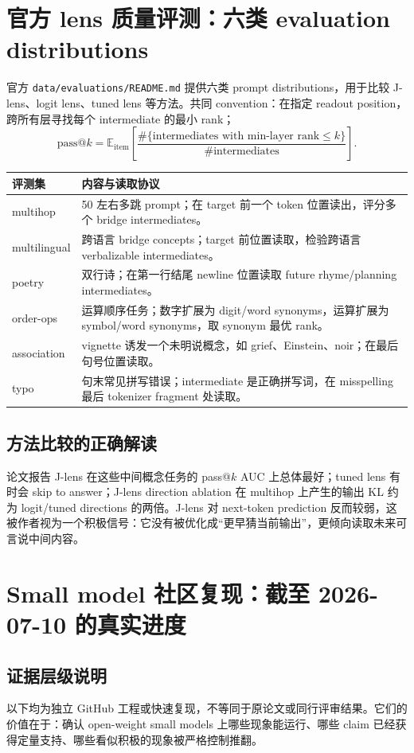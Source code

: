 \documentclass[10.5pt,a4paper]{ctexart}
\begin{document}
\section{官方 lens 质量评测：六类 evaluation distributions}
官方 \texttt{data/evaluations/README.md} 提供六类 prompt distributions，用于比较 J-lens、logit lens、tuned lens 等方法。共同 convention：在指定 readout position，跨所有层寻找每个 intermediate 的最小 rank；
\[
\mathrm{pass@}k
=
\mathbb E_{\mathrm{item}}
\left[
\frac{\#\{\text{intermediates with min-layer rank}\le k\}}{\#\text{intermediates}}
\right].
\]

\begin{longtable}{p{}p{}}
\toprule
评测集 & 内容与读取协议 \\
\midrule
multihop & 50 左右多跳 prompt；在 target 前一个 token 位置读出，评分多个 bridge intermediates。 \\
multilingual & 跨语言 bridge concepts；target 前位置读取，检验跨语言 verbalizable intermediates。 \\
poetry & 双行诗；在第一行结尾 newline 位置读取 future rhyme/planning intermediates。 \\
order-ops & 运算顺序任务；数字扩展为 digit/word synonyms，运算扩展为 symbol/word synonyms，取 synonym 最优 rank。 \\
association & vignette 诱发一个未明说概念，如 grief、Einstein、noir；在最后句号位置读取。 \\
typo & 句末常见拼写错误；intermediate 是正确拼写词，在 misspelling 最后 tokenizer fragment 处读取。 \\
\bottomrule
\end{longtable}

\subsection{方法比较的正确解读}
论文报告 J-lens 在这些中间概念任务的 pass@$k$ AUC 上总体最好；tuned lens 有时会 skip to answer；J-lens direction ablation 在 multihop 上产生的输出 KL 约为 logit/tuned directions 的两倍。J-lens 对 next-token prediction 反而较弱，这被作者视为一个积极信号：它没有被优化成“更早猜当前输出”，更倾向读取未来可言说中间内容。

\section{Small model 社区复现：截至 2026-07-10 的真实进度}

\subsection{证据层级说明}
以下均为独立 GitHub 工程或快速复现，不等同于原论文或同行评审结果。它们的价值在于：确认 open-weight small models 上哪些现象能运行、哪些 claim 已经获得定量支持、哪些看似积极的现象被严格控制推翻。
\end{document}
